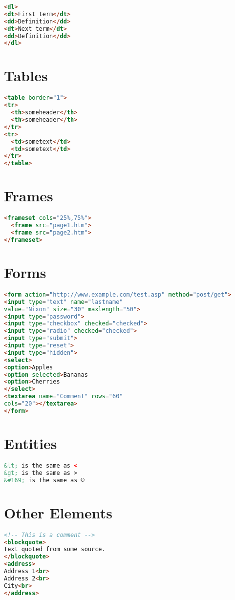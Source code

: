 \begin{lstlisting}[language=HTML]
<dl>
<dt>First term</dt>
<dd>Definition</dd>
<dt>Next term</dt>
<dd>Definition</dd>
</dl>
\end{lstlisting}

\section{Tables}

\begin{lstlisting}[language=HTML]
<table border="1">
<tr>
  <th>someheader</th>
  <th>someheader</th>
</tr>
<tr>
  <td>sometext</td>
  <td>sometext</td>
</tr>
</table>
\end{lstlisting}


\section{Frames}

\begin{lstlisting}[language=HTML]
<frameset cols="25%,75%">
  <frame src="page1.htm">
  <frame src="page2.htm">
</frameset>
\end{lstlisting}


\section{Forms}


\begin{lstlisting}[language=HTML]
<form action="http://www.example.com/test.asp" method="post/get">
<input type="text" name="lastname"
value="Nixon" size="30" maxlength="50">
<input type="password">
<input type="checkbox" checked="checked">
<input type="radio" checked="checked">
<input type="submit">
<input type="reset">
<input type="hidden">
<select>
<option>Apples
<option selected>Bananas
<option>Cherries
</select>
<textarea name="Comment" rows="60"
cols="20"></textarea>
</form>
\end{lstlisting}

\section{Entities}

\begin{lstlisting}[language=HTML]
&lt; is the same as <
&gt; is the same as >
&#169; is the same as ©
\end{lstlisting}

\section{Other Elements}


\begin{lstlisting}[language=HTML]
<!-- This is a comment -->
<blockquote>
Text quoted from some source.
</blockquote>
<address>
Address 1<br>
Address 2<br>
City<br>
</address>
\end{lstlisting}





























